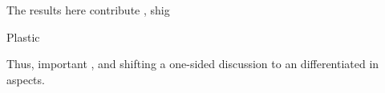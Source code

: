 The results here contribute , shig

Plastic

Thus, important , and shifting a one-sided discussion to
an differentiated in aspects.














 






